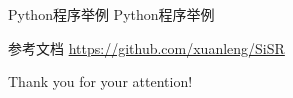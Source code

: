 \documentclass[xcolor=x11names,compress,10pt]{ctexbeamer}
\begin{document}
\begin{frame}{Python程序举例}
\centering
Python程序举例
\end{frame}


\begin{frame}{参考文档}
\url{https://github.com/xuanleng/SiSR}
\end{frame}


\begin{frame}

{\huge Thank you for your attention!}

\end{frame}





\end{document}
